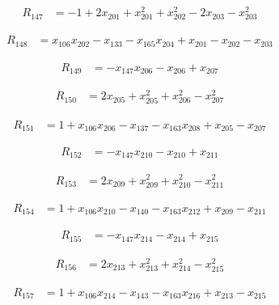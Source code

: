 \begin{align*}
R_{147} &= -1 +2 x_{201} +x_{201}^{2} +x_{202}^{2} -2 x_{203} -x_{203}^{2}
\end{align*}

\begin{align*}
R_{148} &= x_{106} x_{202} -x_{133} -x_{165} x_{204} +x_{201} -x_{202} -x_{203}
\end{align*}

\begin{align*}
R_{149} &= -x_{147} x_{206} -x_{206} +x_{207}
\end{align*}

\begin{align*}
R_{150} &= 2 x_{205} +x_{205}^{2} +x_{206}^{2} -x_{207}^{2}
\end{align*}

\begin{align*}
R_{151} &= 1 +x_{106} x_{206} -x_{137} -x_{163} x_{208} +x_{205} -x_{207}
\end{align*}

\begin{align*}
R_{152} &= -x_{147} x_{210} -x_{210} +x_{211}
\end{align*}

\begin{align*}
R_{153} &= 2 x_{209} +x_{209}^{2} +x_{210}^{2} -x_{211}^{2}
\end{align*}

\begin{align*}
R_{154} &= 1 +x_{106} x_{210} -x_{140} -x_{163} x_{212} +x_{209} -x_{211}
\end{align*}

\begin{align*}
R_{155} &= -x_{147} x_{214} -x_{214} +x_{215}
\end{align*}

\begin{align*}
R_{156} &= 2 x_{213} +x_{213}^{2} +x_{214}^{2} -x_{215}^{2}
\end{align*}

\begin{align*}
R_{157} &= 1 +x_{106} x_{214} -x_{143} -x_{163} x_{216} +x_{213} -x_{215}
\end{align*}

